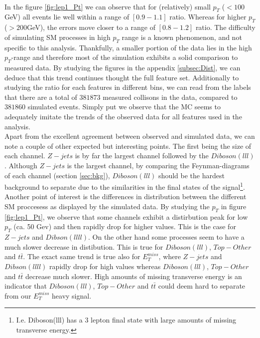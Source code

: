 \\
In the figure \ref{fig:lep1_Pt} we can observe that for (relatively) small $p_T$ ($<100$GeV) all events lie well within a range of $[0.9-1.1]$ ratio. 
Whereas for higher $p_T$ ($>200$GeV), the errors move closer to a range of $[0.8-1.2]$ ratio. The difficulty of simulating \ac{SM} processes 
in high $p_T$ range is a known phenomenon, and not specific to this analysis. Thankfully, a smaller portion of the data lies in the high $p_T$-range
and therefore most of the simulation exhibits a solid comparison to measured data. By studying the figures in the appendix \ref{subsec:Dist}, 
we can deduce that this trend continues thought the full feature set. Additionally to studying the ratio for each features in different bins,
we can read from the labels that there are a total of $381873$ measured collisons in the data, compared to $381860$ simulated events.
Simply put we observe that the \ac{MC} seems to adequately imitate the trends of the observed data for all features used in the analysis. 
\\
Apart from the excellent agreement between observed and simulated data, we can note a couple of other expected
but interesting points. The first being the size of each channel. $Z-jets$ is by far the largest channel followed
by the $Diboson (lll)$. Although $Z-jets$ is the largest channel, by comparing the Feynman-diagrams of each channel
(section \ref{sec:bkg}), $Diboson(lll)$ should be the hardest background to separate due to the similarities in the 
final states of the signal\footnote{I.e. Diboson(lll) has a 3 lepton final state with large amounts of missing transverse energy.}. Another 
point of interest is the differences in distribution between the different \ac{SM} proccesess as displayed by the 
simulated data. By studying the $p_T$ in figure \ref{fig:lep1_Pt}, we observe that some channels exhibit a distirbution  
peak for low $p_T$ (ca. 50 Gev) and then rapidly drop for higher values. This is the case for $Z-jets$ and $Dibson (llll)$.
On the other hand some processes seem to have a much slower decrease in distibution. This is true for $Diboson(lll)$, $Top-Other$
and $t\bar{t}$. The exact same trend is true also for $E_T^{miss}$, where $Z-jets$ and $Dibson (llll)$ rapidly drop for high values 
whereas $Diboson(lll)$, $Top-Other$ and $t\bar{t}$ decrease much slower. High amounts of missing transverse energy is an indicator that 
$Diboson(lll)$, $Top-Other$ and $t\bar{t}$ could deem hard to separate from our $E_T^{miss}$ heavy signal.
